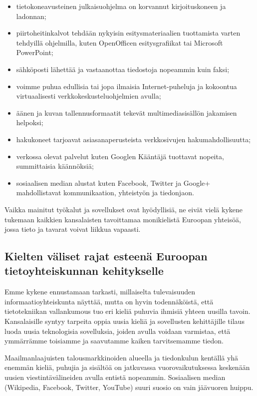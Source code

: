 \begin{multicols}{2}
\begin{itemize}
\item tietokoneavusteinen julkaisuohjelma on korvannut kirjoituskoneen ja ladonnan; 
\item piirtoheitinkalvot tehdään nykyisin esitysmateriaalien tuottamista varten tehdyillä ohjelmilla, kuten \foreignlanguage{english}{OpenOfficen} esitysgrafiikat tai Microsoft PowerPoint;
\item sähköposti lähettää ja vastaanottaa tiedostoja nopeammin kuin faksi;
\item voimme puhua edullisia tai jopa ilmaisia Internet-puheluja ja kokoontua 
virtuaalisesti verkkokeskusteluohjelmien avulla;
\item äänen ja kuvan tallennusformaatit tekevät multimediasisällön jakamisen helpoksi;
\item hakukoneet tarjoavat asiasanaperusteista verkkosivujen hakumahdollisuutta;
\item verkossa olevat palvelut kuten Googlen Kääntäjä tuottavat nopeita, summittaisia
käännöksiä;
\item sosiaalisen median alustat kuten Facebook, Twitter ja Google+ mahdollistavat
kommunikaation, yhteistyön ja tiedonjaon.
\end{itemize}

Vaikka mainitut työkalut ja sovellukset ovat hyödyllisiä, ne eivät vielä kykene tukemaan kaikkien kansalaisten tavoittamaa monikielistä Euroopan yhteisöä, jossa tieto ja tavarat voivat liikkua vapaasti.

\subsection{Kielten väliset rajat esteenä Euroopan tietoyhteiskunnan kehitykselle}

Emme kykene ennustamaan tarkasti, millaiselta tulevaisuuden informaatioyhteiskunta näyttää, mutta on hyvin todennäköistä, että tietotekniikan vallankumous tuo eri kieliä puhuvia ihmisiä yhteen uusilla tavoin. Kansalaisille syntyy tarpeita oppia uusia kieliä ja sovellusten kehittäjille tilaus luoda uusia teknologisia sovelluksia, joiden avulla voidaan varmistaa, että ymmärrämme toisiamme ja saavutamme kaiken tarvitsemamme tiedon.  


Maailmanlaajuisten talousmarkkinoiden alueella ja tiedonkulun kentällä yhä enemmän kieliä, puhujia ja sisältöä on jatkuvassa vuorovaikutuksessa keskenään uusien viestintävälineiden avulla entistä nopeammin. Sosiaalisen median (Wikipedia, Facebook, Twitter, YouTube) 
suuri suosio on vain jäävuoren huippu.


\end{multicols}

